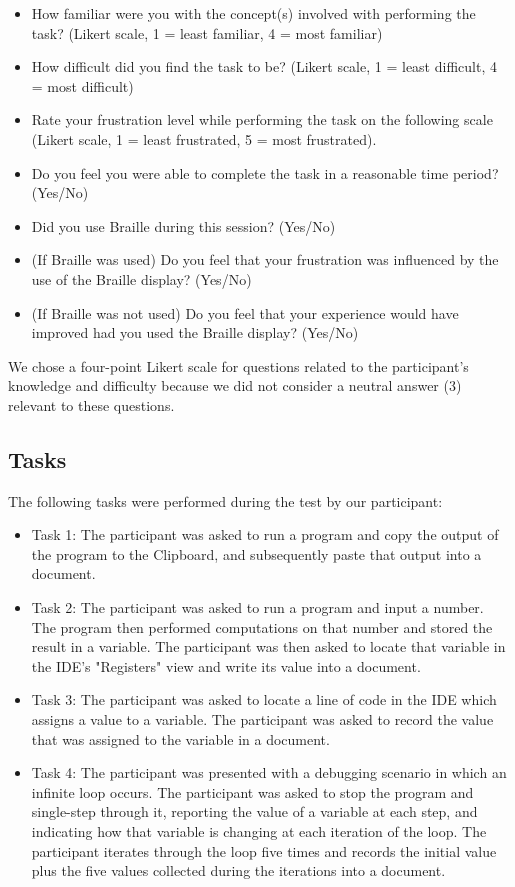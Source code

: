 \documentclass[11.5pt]{sig-alternate} %
\begin{document}
\begin{large}
\begin{itemize}
    \item How familiar were you with the concept(s) involved with performing the task? (Likert scale, 1 = least familiar, 4 = most familiar)
    \item How difficult did you find the task to be? (Likert scale, 1 = least difficult, 4 = most difficult)
    \item Rate your frustration level while performing the task on the following scale (Likert scale, 1 = least frustrated, 5 = most frustrated).
    \item Do you feel you were able to complete the task in a reasonable time period? (Yes/No)
    \item Did you use Braille during this session? (Yes/No)
    \item (If Braille was used) Do you feel that your frustration was influenced by the use of the Braille display? (Yes/No)
    \item (If Braille was not used) Do you feel that your experience would have improved had you used the Braille display? (Yes/No)
\end{itemize}

We chose a four-point Likert scale for questions related to the participant’s knowledge and difficulty because we did not consider a neutral answer (3) relevant to these questions.


\subsection*{Tasks}
 
The following tasks were performed during the test by our participant:
\begin{itemize}
    \item Task 1: The participant was asked to run a program and copy the output of the program to the Clipboard, and subsequently paste that output into a document.
    \item Task 2: The participant was asked to run a program and input a number. The program then performed computations on that number and stored the result in a variable. The participant was then asked to locate that variable in the IDE’s "Registers" view and write its value into a document.
    \item Task 3: The participant was asked to locate a line of code in the IDE which assigns a value to a variable. The participant was asked to record the value that was assigned to the variable in a document.
    \item Task 4: The participant was presented with a debugging scenario in which an infinite loop occurs. The participant was asked to stop the program and single-step through it, reporting the value of a variable at each step, and indicating how that variable is changing at each iteration of the loop. The participant iterates through the loop five times and records the initial value plus the five values collected during the iterations into a document.
\end{itemize}


\end{large}
\end{document}
